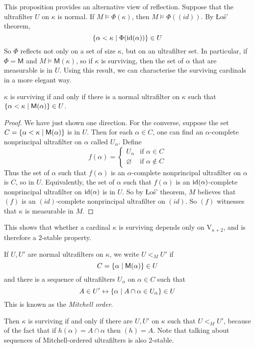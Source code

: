 This proposition provides an alternative view of reflection.
Suppose that the ultrafilter \( U \) on \( \kappa \) is normal.
If \( M \vDash \Phi(\kappa) \), then \( M \vDash \Phi((id)) \).
By \L{}o\'s' theorem,
\[ \qty{\alpha < \kappa \mid \Phi(\operatorname{id}(\alpha))} \in U \]
So \( \Phi \) reflects not only on a set of size \( \kappa \), but on an ultrafilter set.
In particular, if \( \Phi = \mathsf{M} \) and \( M \vDash \mathsf{M}(\kappa) \), so if \( \kappa \) is surviving, then the set of \( \alpha \) that are measurable is in \( U \).
Using this result, we can characterise the surviving cardinals in a more elegant way.
\begin{theorem}
    \( \kappa \) is surviving if and only if there is a normal ultrafilter on \( \kappa \) such that \( \qty{\alpha < \kappa \mid \mathsf{M}(\alpha)} \in U \).
\end{theorem}
\begin{proof}
    We have just shown one direction.
    For the converse, suppose the set \( C = \qty{\alpha < \kappa \mid \mathsf{M}(\alpha)} \) is in \( U \).
    Then for each \( \alpha \in C \), one can find an \( \alpha \)-complete nonprincipal ultrafilter on \( \alpha \) called \( U_\alpha \).
    Define
    \[ f(\alpha) = \begin{cases}
        U_\alpha & \text{if } \alpha \in C \\
        \varnothing & \text{if } \alpha \notin C
    \end{cases} \]
    Thus the set of \( \alpha \) such that \( f(\alpha) \) is an \( \alpha \)-complete nonprincipal ultrafilter on \( \alpha \) is \( C \), so in \( U \).
    Equivalently, the set of \( \alpha \) such that \( f(\alpha) \) is an \( \operatorname{id}(\alpha) \)-complete nonprincipal ultrafilter on \( \operatorname{id}(\alpha) \) is in \( U \).
    So by \L{}o\'s' theorem, \( M \) believes that \( (f) \) is an \( (id) \)-complete nonprincipal ultrafilter on \( (id) \).
    So \( (f) \) witnesses that \( \kappa \) is measurable in \( M \).
\end{proof}
This shows that whether a cardinal \( \kappa \) is surviving depends only on \( \mathrm{V}_{\kappa + 2} \), and is therefore a 2-stable property.
\begin{definition}
    If \( U, U' \) are normal ultrafilters on \( \kappa \), we write \( U <_M U' \) if
    \[ C = \qty{\alpha \mid \mathsf{M}(\alpha)} \in U \]
    and there is a sequence of ultrafilters \( U_\alpha \) on \( \alpha \in C \) such that
    \[ A \in U' \leftrightarrow \qty{\alpha \mid A \cap \alpha \in U_\alpha} \in U \]
    This is known as the \emph{Mitchell order}.
\end{definition}
Then \( \kappa \) is surviving if and only if there are \( U, U' \) on \( \kappa \) such that \( U <_M U' \), because of the fact that if \( h(\alpha) = A \cap \alpha \) then \( (h) = A \).
Note that talking about sequences of Mitchell-ordered ultrafilters is also 2-stable.

